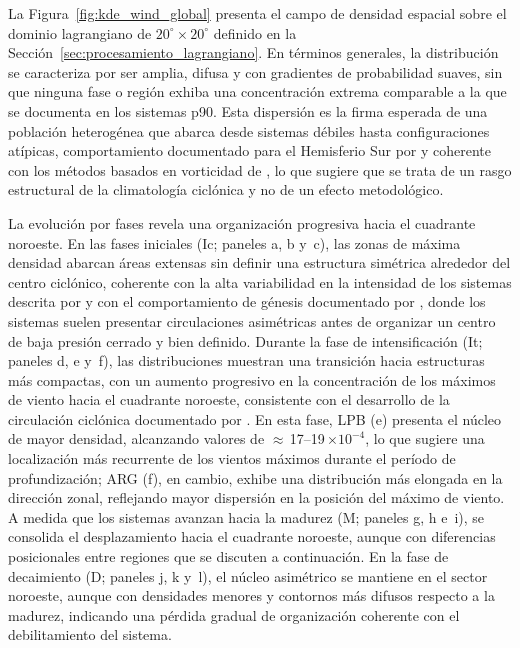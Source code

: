 La Figura~\ref{fig:kde_wind_global} presenta el campo de densidad espacial sobre el dominio lagrangiano de $20^{\circ} \times 20^{\circ}$ definido en la Sección~\ref{sec:procesamiento_lagrangiano}. 
En términos generales, la distribución se caracteriza por ser amplia, difusa y con gradientes de probabilidad suaves, sin que ninguna fase o región exhiba una concentración extrema comparable a la que se documenta en los sistemas p90. 
Esta dispersión es la firma esperada de una población heterogénea que abarca desde sistemas débiles hasta configuraciones atípicas, comportamiento documentado para el Hemisferio Sur por \citet{simmonds2000mean} y coherente con los métodos basados en vorticidad de \citet{sinclair1994objective}, lo que sugiere que se trata de un rasgo estructural de la climatología ciclónica y no de un efecto metodológico.

La evolución por fases revela una organización progresiva hacia el cuadrante noroeste. 
En las fases iniciales (Ic; paneles a, b y~c), las zonas de máxima densidad abarcan áreas extensas sin definir una estructura simétrica alrededor del centro ciclónico, coherente con la alta variabilidad en la intensidad de los sistemas descrita por \citet{reboita2010south} y con el comportamiento de génesis documentado por \citet{bartolomei2024extremos}, donde los sistemas suelen presentar circulaciones asimétricas antes de organizar un centro de baja presión cerrado y bien definido. 
Durante la fase de intensificación (It; paneles d, e y~f), las distribuciones muestran una transición hacia estructuras más compactas, con un aumento progresivo en la concentración de los máximos de viento hacia el cuadrante noroeste, consistente con el desarrollo de la circulación ciclónica documentado por \citet{gramcianinov2019properties}. 
En esta fase, LPB (e) presenta el núcleo de mayor densidad, alcanzando valores de ${\approx}$\,17--19\,$\times10^{-4}$, lo que sugiere una localización más recurrente de los vientos máximos durante el período de profundización; ARG (f), en cambio, exhibe una distribución más elongada en la dirección zonal, reflejando mayor dispersión en la posición del máximo de viento.
A medida que los sistemas avanzan hacia la madurez (M; paneles g, h e~i), se consolida el desplazamiento hacia el cuadrante noroeste, aunque con diferencias posicionales entre regiones que se discuten a continuación. 
En la fase de decaimiento (D; paneles j, k y~l), el núcleo asimétrico se mantiene en el sector noroeste, aunque con densidades menores y contornos más difusos respecto a la madurez, indicando una pérdida gradual de organización coherente con el debilitamiento del sistema.

